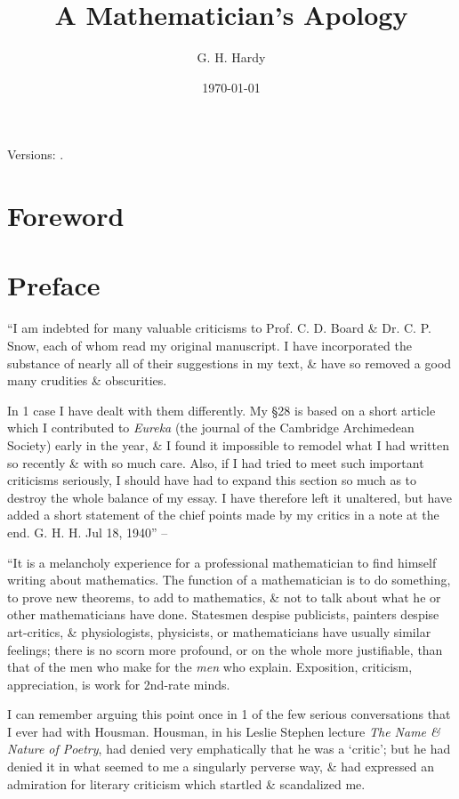 \documentclass{article}
\title{A Mathematician's Apology}
\author{G. H. Hardy}
\date{\today}
\numberwithin{equation}{section}
\begin{document}
\maketitle
\textsf{Versions:} \cite{Hardy1940, Hardy1992, Hardy2022}.
\tableofcontents


\section{Foreword}


\section{Preface}
``I am indebted for many valuable criticisms to Prof. C. D. Board \& Dr. C. P. Snow, each of whom read my original manuscript. I have incorporated the substance of nearly all of their suggestions in my text, \& have so removed a good many crudities \& obscurities.

In 1 case I have dealt with them differently. My \S28 is based on a short article which I contributed to \textit{Eureka} (the journal of the Cambridge Archimedean Society) early in the year, \& I found it impossible to remodel what I had written so recently \& with so much care. Also, if I had tried to meet such important criticisms seriously, I should have had to expand this section so much as to destroy the whole balance of my essay. I have therefore left it unaltered, but have added a short statement of the chief points made by my critics in a note at the end. G. H. H. Jul 18, 1940'' -- \cite[p. 59]{Hardy1992}

 ``It is a melancholy experience for a professional mathematician to find himself writing about mathematics. The function of a mathematician is to do something, to prove new theorems, to add to mathematics, \& not to talk about what he or other mathematicians have done. Statesmen despise publicists, painters despise art-critics, \& physiologists, physicists, or mathematicians have usually similar feelings; there is no scorn more profound, or on the whole more justifiable, than that of the men who make for the \textit{men} who explain. Exposition, criticism, appreciation, is work for 2nd-rate minds.

I can remember arguing this point once in 1 of the few serious conversations that I ever had with Housman. Housman, in his Leslie Stephen lecture \textit{The Name \& Nature of Poetry}, had denied very emphatically that he was a `critic'; but he had denied it in what seemed to me a singularly perverse way, \& had expressed an admiration for literary criticism which startled \& scandalized me.
\end{document}
